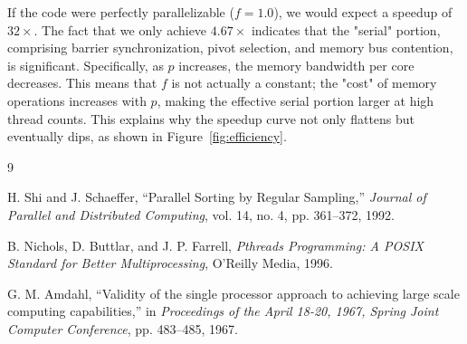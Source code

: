 \documentclass[11pt]{article}
\begin{document}
If the code were perfectly parallelizable ($f=1.0$), we would expect a speedup of $32\times$. The fact that we only achieve $4.67\times$ indicates that the "serial" portion, comprising barrier synchronization, pivot selection, and memory bus contention, is significant. Specifically, as $p$ increases, the memory bandwidth per core decreases. This means that $f$ is not actually a constant; the "cost" of memory operations increases with $p$, making the effective serial portion larger at high thread counts. This explains why the speedup curve not only flattens but eventually dips, as shown in Figure~\ref{fig:efficiency}.
\begin{thebibliography}{9}

H. Shi and J. Schaeffer, 
``Parallel Sorting by Regular Sampling,'' 
\textit{Journal of Parallel and Distributed Computing}, vol. 14, no. 4, pp. 361--372, 1992.

B. Nichols, D. Buttlar, and J. P. Farrell, 
\textit{Pthreads Programming: A POSIX Standard for Better Multiprocessing}, 
O'Reilly Media, 1996.

G. M. Amdahl, 
``Validity of the single processor approach to achieving large scale computing capabilities,'' 
in \textit{Proceedings of the April 18-20, 1967, Spring Joint Computer Conference}, pp. 483--485, 1967.

\end{thebibliography}
\end{document}
